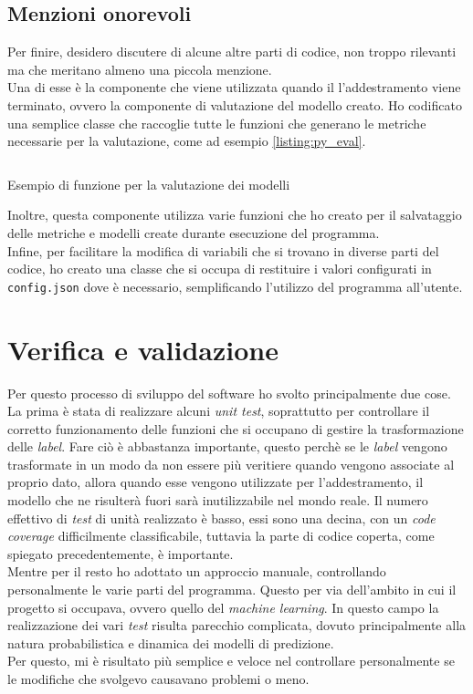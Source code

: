 \subsection{Menzioni onorevoli}\noindent
Per finire, desidero discutere di alcune altre parti di codice, non troppo rilevanti ma che meritano almeno una piccola menzione.\\
Una di esse è la componente che viene utilizzata quando il l'addestramento viene terminato, ovvero la componente di valutazione del modello creato.
Ho codificato una semplice classe che raccoglie tutte le funzioni che generano le metriche necessarie per la valutazione, come ad esempio \ref{listing:py_eval}.
\begin{listing}[H]
    \inputminted[fontsize=\small]{python}{code/evaluation_example.py}
    \caption{Esempio di funzione per la valutazione dei modelli}
    \label{listing:py_eval}
\end{listing}\noindent
Inoltre, questa componente utilizza varie funzioni che ho creato per il salvataggio delle metriche e modelli create durante esecuzione del programma.\\
Infine, per facilitare la modifica di variabili che si trovano in diverse parti del codice, ho creato una classe che si occupa di restituire i valori configurati in \texttt{config.json} dove è necessario, semplificando l'utilizzo del programma all'utente.

\section{Verifica e validazione}\label{sec:test-validation}\noindent
Per questo processo di sviluppo del software ho svolto principalmente due cose.
La prima è stata di realizzare alcuni \textit{unit test}, soprattutto per controllare il corretto funzionamento delle funzioni che si occupano di gestire la trasformazione delle \textit{label}.
Fare ciò è abbastanza importante, questo perchè se le \textit{label} vengono trasformate in un modo da non essere più veritiere quando vengono associate al proprio dato, allora quando esse vengono utilizzate per l'addestramento, il modello che ne risulterà fuori sarà inutilizzabile nel mondo reale.
Il numero effettivo di \textit{test} di unità realizzato è basso, essi sono una decina, con un \textit{code coverage} difficilmente classificabile, tuttavia la parte di codice coperta, come spiegato precedentemente, è importante.\\
Mentre per il resto ho adottato un approccio manuale, controllando personalmente le varie parti del programma.
Questo per via dell'ambito in cui il progetto si occupava, ovvero quello del \textit{machine learning}. In questo campo la realizzazione dei vari \textit{test} risulta parecchio complicata, dovuto principalmente alla natura probabilistica e dinamica dei modelli di predizione.\\
Per questo, mi è risultato più semplice e veloce nel controllare personalmente se le modifiche che svolgevo causavano problemi o meno.

